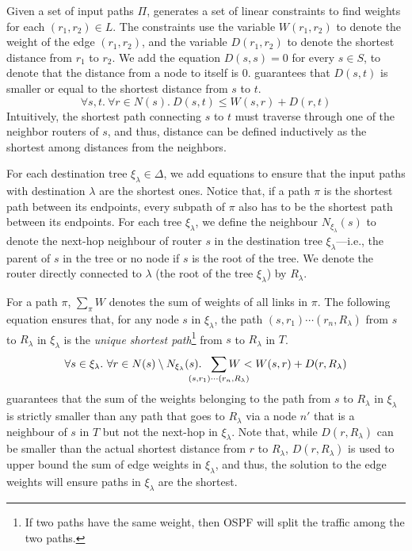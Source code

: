 Given a set of input paths $\Pi$, \name 
generates a set of linear constraints to 
find weights 
for each $(r_1, r_2) \in L$.
The constraints use the variable $W(r_1, r_2)$
to denote the weight of the edge $(r_1, r_2)$, and the variable
$D(r_1, r_2)$ to denote the 
shortest distance from $r_1$ to $r_2$.
We add the equation $D(s, s) = 0$
for every $s\in S$, to denote that the distance
from a node to itself is $0$.
 guarantees that $D(s,t)$ is smaller or equal to
the shortest distance from $s$ to $t$.
\begin{equation} \label{eq:distance}
\forall s, t. ~\forall r \in N(s).~
D(s,t) \leq W(s,r) + D(r,t)
\end{equation}
Intuitively, the shortest path connecting $s$ to $t$
must traverse through one of the neighbor routers of $s$,
and thus, distance can be defined inductively as the 
shortest among distances from the neighbors. 

For each destination tree $\xi_\lambda\in\Delta$, we add equations to ensure 
that the input paths with destination $\lambda$ are the shortest ones.
Notice that, if a path $\pi$
is the shortest path between its endpoints, every 
subpath of $\pi$ also has to be the shortest path between its endpoints.
For each tree $\xi_\lambda$, we define the neighbour
 $N_{\xi_\lambda}(s)$ to denote the 
next-hop neighbour of router $s$ in the destination tree $\xi_\lambda$---i.e., the parent
of $s$ in the tree or no node if $s$ is the root of the tree. We denote the
router directly connected to $\lambda$ (the root of the tree $\xi_\lambda$) by $R_\lambda$.

For a path $\pi$, 
$\sum_{\pi} W$ denotes the sum of weights of all 
links in $\pi$. 
The following equation ensures that, for any node $s$ in 
$\xi_\lambda$, 
the path $(s,r_1)\cdots (r_n,R_\lambda)$ from $s$ to $R_\lambda$ 
in $\xi_\lambda$ is the 
\emph{unique shortest path}\footnote{
If two paths have the same weight, then OSPF will 
split the traffic among the two paths.
} from $s$ to $R_\lambda$ in $T$. 
\begin{equation} \label{eq:unique}
\forall s \in \xi_\lambda. ~
\forall r \in N(s) \setminus N_{\xi_\lambda}(s).~~
\sum_{\mathclap{\substack{(s,r_1)\cdots (r_n,R_\lambda)}}} 
W < W(s,r) + D(r, R_\lambda)
\end{equation}
 guarantees that 
the sum of the weights belonging to the path 
from $s$ to $R_\lambda$ in $\xi_\lambda$ 
is strictly smaller than 
any path that goes to $R_\lambda$ via 
a node $n'$ that is a neighbour of $s$ in $T$ but not 
the next-hop in $\xi_\lambda$. Note that,
while $D(r, R_\lambda)$ can be smaller 
than the actual shortest
distance from $r$ to $R_\lambda$, 
$D(r, R_\lambda)$ is used to upper bound the sum of edge weights 
in $\xi_\lambda$, and  
thus, the solution to the edge weights will ensure 
paths in $\xi_\lambda$ are the shortest. 

